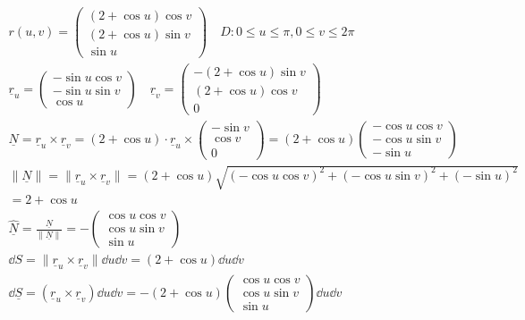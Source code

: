 \documentclass[00_complete]{subfiles}
\begin{document}
\begin{example}
    \begin{gather*}
        r(u,v)=\begin{pmatrix}
            (2+\cos u) \cos v \\
            (2+\cos u) \sin v \\
            \sin u
        \end{pmatrix} \quad D: 0 \leq u \leq \pi, 0 \leq v \leq 2\pi \\
        \underline r_u=\begin{pmatrix}
            -\sin u \cos v \\ -\sin u \sin v \\ \cos u
        \end{pmatrix} \quad \underline r_v = \begin{pmatrix}
            -(2+\cos u)\sin v \\ (2+\cos u)\cos v \\ 0
        \end{pmatrix} \\
        \underline N = \underline r_u \times \underline r_v = (2+\cos u) \cdot \underline r_u
        \times \begin{pmatrix}
            -\sin v \\ \cos v \\ 0
        \end{pmatrix} = (2+\cos u )\begin{pmatrix}
            -\cos u \cos v \\ - \cos u \sin v \\ -\sin u
        \end{pmatrix} \\
        \|\underline N\|=\|\underline r_u \times \underline r_v\| = (2+\cos
        u)\sqrt{(-\cos u \cos v)^2 + (-\cos u \sin v)^2+(-\sin u)^2} \\
        =2+\cos u \\
        \underline{\hat N} = \frac{\underline N}{\|\underline N\|} =
        -\begin{pmatrix}
            \cos u \cos v \\ \cos u \sin v \\ \sin u
        \end{pmatrix} \\
        \dd{S} = \|\underline r_u \times\underline r_v\|\dd{u}\dd{v}=(2+\cos
        u)\dd{u}\dd{v} \\
        \dd{\underline S}= (\underline r_u \times \underline r_v)\dd{u}\dd{v} =
        -(2+\cos u)\begin{pmatrix}
            \cos u \cos v \\ \cos u \sin v \\ \sin u
        \end{pmatrix} \dd{u}\dd{v}
    \end{gather*}
\end{example}
\end{document}

